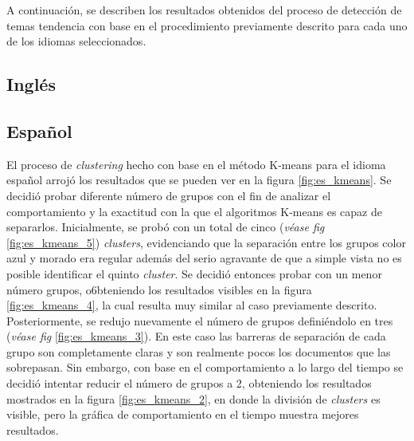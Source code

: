 A continuación, se describen los resultados obtenidos del proceso de detección de temas tendencia con base en el procedimiento previamente descrito para cada uno de los idiomas seleccionados.

\subsection{Inglés}
\subsection{Español}

El proceso de \textit{clustering} hecho con base en el método K-means para el idioma español arrojó los resultados que se pueden ver en la figura \ref{fig:es_kmeans}. Se decidió probar diferente número de grupos con el fin de analizar el comportamiento y la exactitud con la que el algoritmos K-means es capaz de separarlos. Inicialmente, se probó con un total de cinco (\textit{véase fig} \ref{fig:es_kmeans_5}) \textit{clusters}, evidenciando que la separación entre los grupos color azul y morado era regular además del serio agravante de que a simple vista no es posible identificar el quinto \textit{cluster}. Se decidió entonces probar con un menor número grupos, o6bteniendo los resultados visibles en la figura \ref{fig:es_kmeans_4}, la cual resulta muy similar al caso previamente descrito.\\

Posteriormente, se redujo nuevamente el número de grupos definiéndolo en tres (\textit{véase fig} \ref{fig:es_kmeans_3}). En este caso las barreras de separación de cada grupo son completamente claras y son realmente pocos los documentos que las sobrepasan. Sin embargo, con base en el comportamiento a lo largo del tiempo se decidió intentar reducir el número de grupos a 2, obteniendo los resultados mostrados en la figura \ref{fig:es_kmeans_2}, en donde la división de \textit{clusters} es visible, pero la gráfica de comportamiento en el tiempo muestra mejores resultados.

